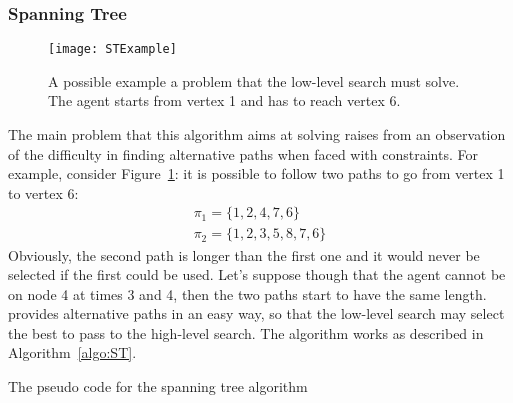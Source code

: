 \subsubsection{Spanning Tree}
\begin{figure}[tb]
  \centering
  \texttt{[image: STExample]}
  \caption{A possible example a  problem that the low-level search
  must solve. The agent starts from vertex 1 and has to reach vertex 6.}
  \label{fig:STExample}
\end{figure}
The main problem that this algorithm aims at solving raises from an observation
of the difficulty in finding alternative paths when faced with constraints. For
example, consider Figure~\ref{fig:STExample}: it is possible to follow two
paths to go from vertex 1 to vertex 6:
\[
  \begin{array}{l}
    \pi_1 = \{1,2,4,7,6\}\\
    \pi_2 = \{1,2,3,5,8,7,6\}
  \end{array}
\]
Obviously, the second path is longer than the first one and it would never be
selected if the first could be used. Let's suppose though that the agent cannot
be on node 4 at times 3 and 4, then the two paths start to have the same 
length. \newline
{} provides alternative paths in an easy way, so that the
low-level search may select the best to pass to the high-level search. The
algorithm works as described in Algorithm~\ref{algo:ST}.
\begin{algorithm}[htb]
  \DontPrintSemicolon
  \caption{The pseudo code for the spanning tree algorithm}
  \label{algo:ST}

  \;
  \;
\end{algorithm}\newline
